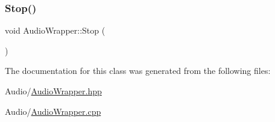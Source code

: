\mbox{\label{classAudioWrapper_a95e9bb9ed67d20a5f895659b495ed53d}} 
\subsubsection{\texorpdfstring{Stop()}{Stop()}}
{\footnotesize\ttfamily void Audio\+Wrapper\+::\+Stop (\begin{DoxyParamCaption}{ }\end{DoxyParamCaption})}



The documentation for this class was generated from the following files\+:\begin{DoxyCompactItemize}
\item 
Audio/\mbox{\hyperlink{AudioWrapper_8hpp}{Audio\+Wrapper.\+hpp}}\item 
Audio/\mbox{\hyperlink{AudioWrapper_8cpp}{Audio\+Wrapper.\+cpp}}\end{DoxyCompactItemize}
